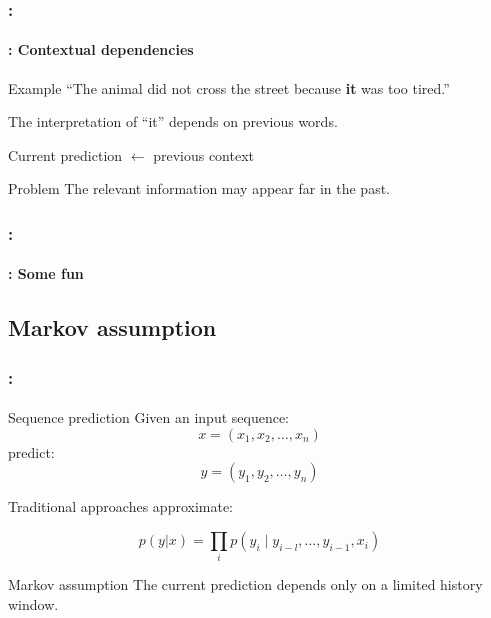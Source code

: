 \documentclass[xcolor=table]{beamer}
\begin{document}
\begin{frame}
	\frametitle{\insertshortsubtitle: \insertsection}
	\framesubtitle{\insertsubsection: Contextual dependencies}
	
	\begin{exampleblock}{Example}
		``The animal did not cross the street because \textbf{it} was too tired.''
	\end{exampleblock}
	
	\vspace{0.3cm}
	
	The interpretation of ``it'' depends on previous words.
	
	\vspace{0.3cm}
	
	\begin{center}
		Current prediction $\leftarrow$ previous context
	\end{center}
	
	\vspace{0.3cm}
	
	\begin{alertblock}{Problem}
		The relevant information may appear far in the past.
	\end{alertblock}
	
\end{frame}

\begin{frame}
	\frametitle{\insertshortsubtitle: \insertsection}
	\framesubtitle{\insertsubsection: Some fun}
	
	\begin{center}
	\end{center}
	
\end{frame}

\subsection{Markov assumption}

\begin{frame}
	\frametitle{\insertshortsubtitle: \insertsection}
	\framesubtitle{\insertsubsection}
	
	\begin{block}{Sequence prediction}
		Given an input sequence:
		\[
		x = (x_1, x_2, \dots, x_n)
		\]
		predict:
		\[
		y = (y_1, y_2, \dots, y_n)
		\]
	\end{block}
	
	\vspace{0.3cm}
	
	Traditional approaches approximate:
	
	\[
	p(y|x)
	=
	\prod_i
	p(y_i \mid y_{i-l}, \dots, y_{i-1}, x_i)
	\]
	
	\vspace{0.3cm}
	
	\begin{alertblock}{Markov assumption}
		The current prediction depends only on a limited history window.
	\end{alertblock}
	
\end{frame}
\end{document}
